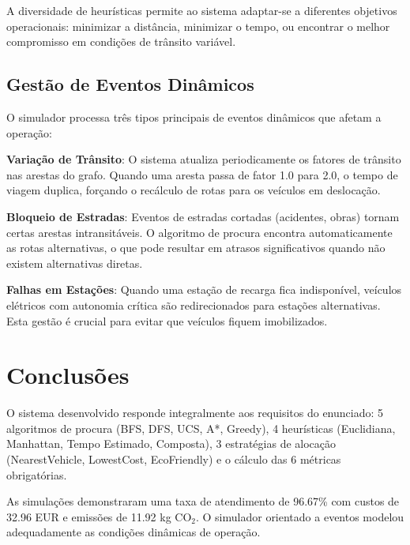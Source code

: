 \documentclass[11pt,a4paper]{article}
\begin{document}
A diversidade de heurísticas permite ao sistema adaptar-se a diferentes objetivos operacionais: minimizar a distância, minimizar o tempo, ou encontrar o melhor compromisso em condições de trânsito variável.

\subsection{Gestão de Eventos Dinâmicos}

O simulador processa três tipos principais de eventos dinâmicos que afetam a operação:

\textbf{Variação de Trânsito}: O sistema atualiza periodicamente os fatores de trânsito nas arestas do grafo. Quando uma aresta passa de fator 1.0 para 2.0, o tempo de viagem duplica, forçando o recálculo de rotas para os veículos em deslocação.

\textbf{Bloqueio de Estradas}: Eventos de estradas cortadas (acidentes, obras) tornam certas arestas intransitáveis. O algoritmo de procura encontra automaticamente as rotas alternativas, o que pode resultar em atrasos significativos quando não existem alternativas diretas.

\textbf{Falhas em Estações}: Quando uma estação de recarga fica indisponível, veículos elétricos com autonomia crítica são redirecionados para estações alternativas. Esta gestão é crucial para evitar que veículos fiquem imobilizados.

\section{Conclusões}

O sistema desenvolvido responde integralmente aos requisitos do enunciado: 5 algoritmos de procura (BFS, DFS, UCS, A*, Greedy), 4 heurísticas (Euclidiana, Manhattan, Tempo Estimado, Composta), 3 estratégias de alocação (NearestVehicle, LowestCost, EcoFriendly) e o cálculo das 6 métricas obrigatórias.

As simulações demonstraram uma taxa de atendimento de 96.67\% com custos de 32.96 EUR e emissões de 11.92 kg CO$_2$. O simulador orientado a eventos modelou adequadamente as condições dinâmicas de operação.
\end{document}
